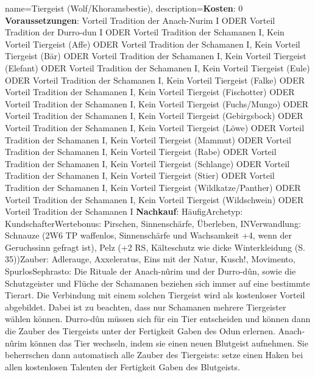 {
    name={Tiergeist (Wolf/Khoramsbestie)},
    description={\textbf{Kosten}: 0 \textbf{Voraussetzungen}: Vorteil Tradition der Anach-Nurim I ODER Vorteil Tradition der Durro-dun I ODER Vorteil Tradition der Schamanen I, Kein Vorteil Tiergeist (Affe) ODER Vorteil Tradition der Schamanen I, Kein Vorteil Tiergeist (Bär) ODER Vorteil Tradition der Schamanen I, Kein Vorteil Tiergeist (Elefant) ODER Vorteil Tradition der Schamanen I, Kein Vorteil Tiergeist (Eule) ODER Vorteil Tradition der Schamanen I, Kein Vorteil Tiergeist (Falke) ODER Vorteil Tradition der Schamanen I, Kein Vorteil Tiergeist (Fischotter) ODER Vorteil Tradition der Schamanen I, Kein Vorteil Tiergeist (Fuchs/Mungo) ODER Vorteil Tradition der Schamanen I, Kein Vorteil Tiergeist (Gebirgsbock) ODER Vorteil Tradition der Schamanen I, Kein Vorteil Tiergeist (Löwe) ODER Vorteil Tradition der Schamanen I, Kein Vorteil Tiergeist (Mammut) ODER Vorteil Tradition der Schamanen I, Kein Vorteil Tiergeist (Rabe) ODER Vorteil Tradition der Schamanen I, Kein Vorteil Tiergeist (Schlange) ODER Vorteil Tradition der Schamanen I, Kein Vorteil Tiergeist (Stier) ODER Vorteil Tradition der Schamanen I, Kein Vorteil Tiergeist (Wildkatze/Panther) ODER Vorteil Tradition der Schamanen I, Kein Vorteil Tiergeist (Wildschwein) ODER Vorteil Tradition der Schamanen I \textbf{Nachkauf}: Häufig\newline Archetyp: Kundschafter\newline Wertebonus: Pirschen, Sinnenschärfe, Überleben, IN\newline Verwandlung: Schnauze (2W6 TP waffenlos, Sinnenschärfe und Wachsamkeit +4, wenn der Geruchssinn gefragt ist), Pelz (+2 RS, Kälteschutz wie dicke Winterkleidung (S. 35))\newline Zauber: Adlerauge, Axxeleratus, Eins mit der Natur, Kusch!, Movimento, Spurlos\newline Sephrasto: Die Rituale der Anach-nûrim und der Durro-dûn, sowie die Schutzgeister und Flüche der Schamanen beziehen sich immer auf eine bestimmte Tierart. Die Verbindung mit einem solchen Tiergeist wird als kostenloser Vorteil abgebildet. Dabei ist zu beachten, dass nur Schamanen mehrere Tiergeister wählen können. Durro-dûn müssen sich für ein Tier entscheiden und können dann die Zauber des Tiergeists unter der Fertigkeit Gaben des Odun erlernen. Anach-nûrim können das Tier wechseln, indem sie einen neuen Blutgeist aufnehmen. Sie beherrschen dann automatisch alle Zauber des Tiergeists: setze einen Haken bei allen kostenlosen Talenten der Fertigkeit Gaben des Blutgeists.}
}


